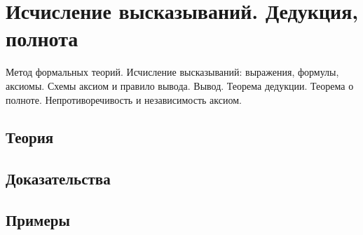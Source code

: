 
\section{Исчисление высказываний. Дедукция, полнота}
\label{sec:2.3a.03-propositional-calculus}

\begin{ticket}
Метод формальных теорий. Исчисление высказываний: выражения, формулы, аксиомы. Схемы аксиом и правило вывода. Вывод. Теорема дедукции. Теорема о полноте. Непротиворечивость и независимость аксиом.
\end{ticket}

\subsection*{Теория}

\subsection*{Доказательства}

\subsection*{Примеры}
